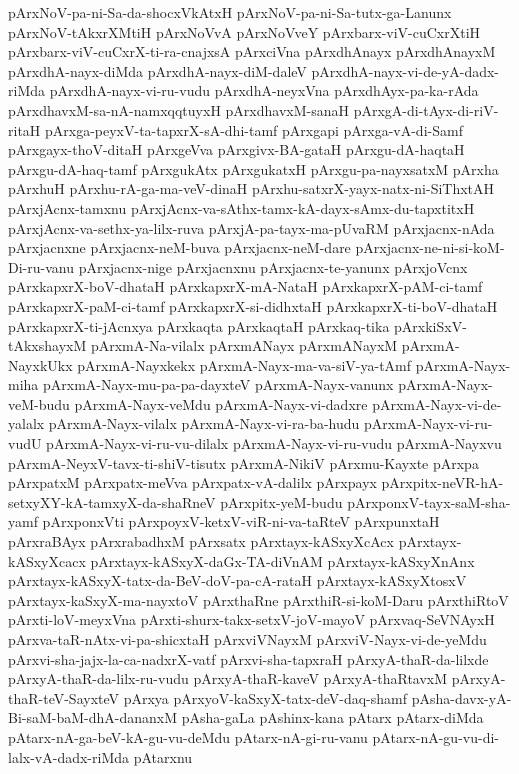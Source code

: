 {pArxNoV-pa-ni-Sa-da-shocxVkAtxH
pArxNoV-pa-ni-Sa-tutx-ga-Lanunx
pArxNoV-tAkxrXMtiH
pArxNoVvA
pArxNoVveY
pArxbarx-viV-cuCxrXtiH
pArxbarx-viV-cuCxrX-ti-ra-cnajxsA
pArxciVna
pArxdhAnayx
pArxdhAnayxM
pArxdhA-nayx-diMda
pArxdhA-nayx-diM-daleV
pArxdhA-nayx-vi-de-yA-dadx-riMda
pArxdhA-nayx-vi-ru-vudu
pArxdhA-neyxVna
pArxdhAyx-pa-ka-rAda
pArxdhavxM-sa-nA-namxqqtuyxH
pArxdhavxM-sanaH
pArxgA-di-tAyx-di-riV-ritaH
pArxga-peyxV-ta-tapxrX-sA-dhi-tamf
pArxgapi
pArxga-vA-di-Samf
pArxgayx-thoV-ditaH
pArxgeVva
pArxgivx-BA-gataH
pArxgu-dA-haqtaH
pArxgu-dA-haq-tamf
pArxgukAtx
pArxgukatxH
pArxgu-pa-nayxsatxM
pArxha
pArxhuH
pArxhu-rA-ga-ma-veV-dinaH
pArxhu-satxrX-yayx-natx-ni-SiThxtAH
pArxjAcnx-tamxnu
pArxjAcnx-va-sAthx-tamx-kA-dayx-sAmx-du-tapxtitxH
pArxjAcnx-va-sethx-ya-lilx-ruva
pArxjA-pa-tayx-ma-pUvaRM
pArxjacnx-nAda
pArxjacnxne
pArxjacnx-neM-buva
pArxjacnx-neM-dare
pArxjacnx-ne-ni-si-koM-Di-ru-vanu
pArxjacnx-nige
pArxjacnxnu
pArxjacnx-te-yanunx
pArxjoVcnx
pArxkapxrX-boV-dhataH
pArxkapxrX-mA-NataH
pArxkapxrX-pAM-ci-tamf
pArxkapxrX-paM-ci-tamf
pArxkapxrX-si-didhxtaH
pArxkapxrX-ti-boV-dhataH
pArxkapxrX-ti-jAcnxya
pArxkaqta
pArxkaqtaH
pArxkaq-tika
pArxkiSxV-tAkxshayxM
pArxmA-Na-vilalx
pArxmANayx
pArxmANayxM
pArxmA-NayxkUkx
pArxmA-Nayxkekx
pArxmA-Nayx-ma-va-siV-ya-tAmf
pArxmA-Nayx-miha
pArxmA-Nayx-mu-pa-pa-dayxteV
pArxmA-Nayx-vanunx
pArxmA-Nayx-veM-budu
pArxmA-Nayx-veMdu
pArxmA-Nayx-vi-dadxre
pArxmA-Nayx-vi-de-yalalx
pArxmA-Nayx-vilalx
pArxmA-Nayx-vi-ra-ba-hudu
pArxmA-Nayx-vi-ru-vudU
pArxmA-Nayx-vi-ru-vu-dilalx
pArxmA-Nayx-vi-ru-vudu
pArxmA-Nayxvu
pArxmA-NeyxV-tavx-ti-shiV-tisutx
pArxmA-NikiV
pArxmu-Kayxte
pArxpa
pArxpatxM
pArxpatx-meVva
pArxpatx-vA-dalilx
pArxpayx
pArxpitx-neVR-hA-setxyXY-kA-tamxyX-da-shaRneV
pArxpitx-yeM-budu
pArxponxV-tayx-saM-sha-yamf
pArxponxVti
pArxpoyxV-ketxV-viR-ni-va-taRteV
pArxpunxtaH
pArxraBAyx
pArxrabadhxM
pArxsatx
pArxtayx-kASxyXcAcx
pArxtayx-kASxyXcacx
pArxtayx-kASxyX-daGx-TA-diVnAM
pArxtayx-kASxyXnAnx
pArxtayx-kASxyX-tatx-da-BeV-doV-pa-cA-rataH
pArxtayx-kASxyXtosxV
pArxtayx-kaSxyX-ma-nayxtoV
pArxthaRne
pArxthiR-si-koM-Daru
pArxthiRtoV
pArxti-loV-meyxVna
pArxti-shurx-takx-setxV-joV-mayoV
pArxvaq-SeVNAyxH
pArxva-taR-nAtx-vi-pa-shicxtaH
pArxviVNayxM
pArxviV-Nayx-vi-de-yeMdu
pArxvi-sha-jajx-la-ca-nadxrX-vatf
pArxvi-sha-tapxraH
pArxyA-thaR-da-lilxde
pArxyA-thaR-da-lilx-ru-vudu
pArxyA-thaR-kaveV
pArxyA-thaRtavxM
pArxyA-thaR-teV-SayxteV
pArxya
pArxyoV-kaSxyX-tatx-deV-daq-shamf
pAsha-davx-yA-Bi-saM-baM-dhA-dananxM
pAsha-gaLa
pAshinx-kana
pAtarx
pAtarx-diMda
pAtarx-nA-ga-beV-kA-gu-vu-deMdu
pAtarx-nA-gi-ru-vanu
pAtarx-nA-gu-vu-di-lalx-vA-dadx-riMda
pAtarxnu
}
